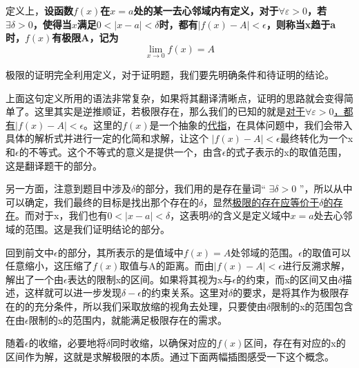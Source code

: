 \documentclass[fontset=none]{ctexart}
\begin{document}
  
    定义上，\textbf{设函数$f(x)$在$x=a$处的某一去心邻域内有定义，对于$\forall \varepsilon >0$，若$\exists \delta >0$，使得当$x$满足$0<\left| x-a \right|<\delta$时，都有$\left| f(x)-A \right|<\epsilon$，则称当x趋于a时，$f(x)$有极限A，记为$$\lim_{x \to 0}f\left( x \right) =A$$}


    极限的证明完全利用定义，对于证明题，我们要先明确条件和待证明的结论。
    
    上面这句定义所用的语法非常复杂，如果将其翻译清晰点，证明的思路就会变得简单了。这里其实是逆推顺证，若极限存在，那么我们的已知的就是\underline{对于$\forall \varepsilon >0$，都有$\left| f(x)-A \right|<\epsilon$}。这里的$f(x)$是一个抽象的\underline{代指}，在具体问题中，我们会带入具体的解析式并进行一定的化简和求解，让这个
    $\left| f(x)-A \right|<\epsilon$最终转化为一个x和$\epsilon$的不等式。这个不等式的意义是提供一个，由含$\epsilon$的式子表示的x的取值范围，这是翻译题干的部分。
    
    另一方面，注意到题目中涉及$\delta$的部分，我们用的是存在量词“ $\exists \delta >0$ ”，所以从中可以确定，我们最终的目标是找出那个存在的$\delta$，显然\underline{极限的存在应等价于$\delta$的存在}。而对于x，我们也有$0<\left| x-a \right|<\delta$，这表明$\delta$的含义是定义域中$x=a$处去心邻域的范围。这是我们证明结论的部分。
    
    回到前文中$\epsilon$的部分，其所表示的是值域中$f(x)=A$处邻域的范围。$\epsilon$的取值可以任意缩小，这压缩了$f(x)$取值与A的距离。而由$\left| f(x)-A \right|<\epsilon$进行反溯求解，解出了一个由$\epsilon$表达的限制x的区间。如果将其视为x与$\epsilon$的约束，而x的区间又由$\delta$描述，这样就可以进一步发现$\delta-\epsilon$的约束关系。这里对$\delta$的要求，是将其作为极限存在的的充分条件，所以我们采取放缩的视角去处理，只要使由$\delta$限制的x的范围包含在由$\epsilon$限制的x的范围内，就能满足极限存在的需求。
    
    \songti 随着$\epsilon$的收缩，必要地将$\delta$同时收缩，以确保对应的$f(x)$区间，存在有对应的x的区间作为解，这就是求解极限的本质。通过下面两幅插图感受一下这个概念。
\end{document}
